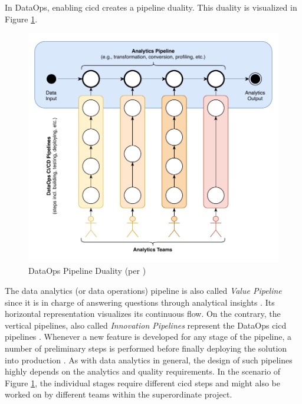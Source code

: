 In DataOps, enabling \ac{cicd} creates a pipeline duality. This duality is visualized in Figure \ref{fig:2-pipeline-duality}.

\newpage

\begin{figure}[h!]
	\centering
	\includegraphics[width=\linewidth]{main-matter/img/2-1-2-pipeline-duality.pdf}
	\caption[DataOps Pipeline Duality]{DataOps Pipeline Duality (per \cite[38\psqq]{Bergh2019})}
	\label{fig:2-pipeline-duality}
\end{figure}

The data analytics (or data operations) pipeline is also called \textit{Value Pipeline} since it is in charge of answering questions through analytical insights \cite[32\psq]{Bergh2019}. Its horizontal representation visualizes its continuous flow. On the contrary, the vertical pipelines, also called \textit{Innovation Pipelines} represent the DataOps \ac{cicd} pipelines \cite[66]{Schmidt2019}. Whenever a new feature is developed for any stage of the pipeline, a number of preliminary steps is performed before finally deploying the solution into production \cite[33]{Bergh2019}. As with data analytics in general, the design of such pipelines highly depends on the analytics and quality requirements. In the scenario of Figure \ref{fig:2-pipeline-duality}, the individual stages require different \ac{cicd} steps and might also be worked on by different teams within the superordinate project.

